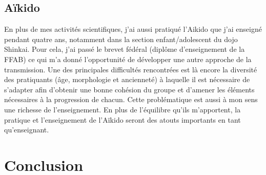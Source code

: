 \documentclass[12pt,a4paper]{article}
\begin{document}
\subsection{Aïkido}

En plus de mes activités scientifiques, j'ai aussi pratiqué l'Aikido que j'ai enseigné pendant quatre ans, notamment dans la section enfant/adolescent du dojo Shinkai.
Pour cela, j'ai passé le brevet fédéral (diplôme d'enseignement de la FFAB) ce qui m'a donné l'opportunité de développer une autre approche de la transmission.
Une des principales difficultés rencontrées est là encore la diversité des pratiquants (âge, morphologie et ancienneté) à laquelle il est nécessaire de s'adapter afin d'obtenir une bonne cohésion du groupe et d'amener les éléments nécessaires à la progression de chacun.
Cette problématique est aussi à mon sens une richesse de l'enseignement.
En plus de l'équilibre qu'ils m'apportent, la pratique et l'enseignement de l'Aïkido seront des atouts importants en tant qu'enseignant.

\section{Conclusion}

%

\nocite{*}

\end{document}

